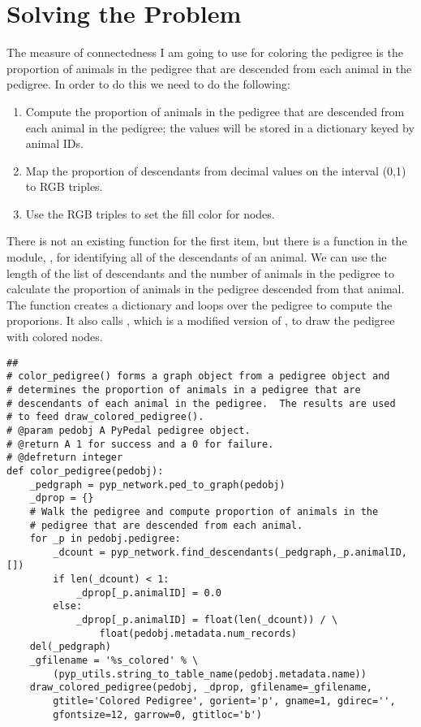 \section{Solving the Problem}
\label{sec:newfeatures-solving-the-problem}
The measure of connectedness I am going to use for coloring the pedigree is the proportion of animals in the pedigree that are descended from each animal in the pedigree.  In order to do this we need to do the following:
\begin{enumerate}
\item Compute the proportion of animals in the pedigree that are descended from each animal in the pedigree; the values will
be stored in a dictionary keyed by animal IDs.
\item Map the proportion of descendants from decimal values on the interval (0,1) to RGB triples.
\item Use the RGB triples to set the fill color for nodes.
\end{enumerate}
There is not an existing function for the first item, but there is a function in the  module, , for identifying all of the descendants of an animal.  We can use the length of the list of descendants and the number of animals in the pedigree to calculate the proportion of animals in the pedigree descended from that animal.  The  function creates a dictionary and loops over the pedigree to compute the proporions.  It also calls , which is a modified version of , to draw the pedigree with colored nodes.
\begin{verbatim}
##
# color_pedigree() forms a graph object from a pedigree object and
# determines the proportion of animals in a pedigree that are
# descendants of each animal in the pedigree.  The results are used
# to feed draw_colored_pedigree().
# @param pedobj A PyPedal pedigree object.
# @return A 1 for success and a 0 for failure.
# @defreturn integer
def color_pedigree(pedobj):
    _pedgraph = pyp_network.ped_to_graph(pedobj)
    _dprop = {}
    # Walk the pedigree and compute proportion of animals in the
    # pedigree that are descended from each animal.
    for _p in pedobj.pedigree:
        _dcount = pyp_network.find_descendants(_pedgraph,_p.animalID,[])
        if len(_dcount) < 1:
            _dprop[_p.animalID] = 0.0
        else:
            _dprop[_p.animalID] = float(len(_dcount)) / \
                float(pedobj.metadata.num_records)
    del(_pedgraph)
    _gfilename = '%s_colored' % \
        (pyp_utils.string_to_table_name(pedobj.metadata.name))
    draw_colored_pedigree(pedobj, _dprop, gfilename=_gfilename,
        gtitle='Colored Pedigree', gorient='p', gname=1, gdirec='',
        gfontsize=12, garrow=0, gtitloc='b')
\end{verbatim}
